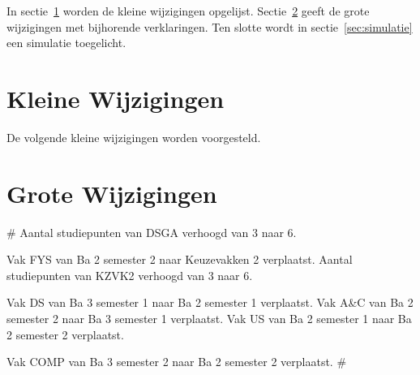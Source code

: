 \documentclass[a4paper]{article}
\begin{document}
        In sectie~\ref{sec:kleine_wijzigingen} worden de kleine wijzigingen opgelijst. Sectie~\ref{sec:grote_wijzigingen} geeft de grote wijzigingen met bijhorende verklaringen. Ten slotte wordt in sectie~\ref{sec:simulatie} een simulatie toegelicht.

    \newpage
    \section{Kleine Wijzigingen}
    \label{sec:kleine_wijzigingen}

    \begin{multicols*}{2}
        De volgende kleine wijzigingen worden voorgesteld.
    \end{multicols*}

    \restoregeometry

    \newpage
    \section{Grote Wijzigingen}
    \label{sec:grote_wijzigingen}

{#
    Aantal studiepunten van DSGA verhoogd van 3 naar 6.

    Vak FYS van Ba 2 semester 2 naar Keuzevakken 2 verplaatst.
    Aantal studiepunten van KZVK2 verhoogd van 3 naar 6.

    Vak DS van Ba 3 semester 1 naar Ba 2 semester 1 verplaatst.
    Vak A&C van Ba 2 semester 2 naar Ba 3 semester 1 verplaatst.
    Vak US van Ba 2 semester 1 naar Ba 2 semester 2 verplaatst.

    Vak COMP van Ba 3 semester 2 naar Ba 2 semester 2 verplaatst.
#}
\end{document}
